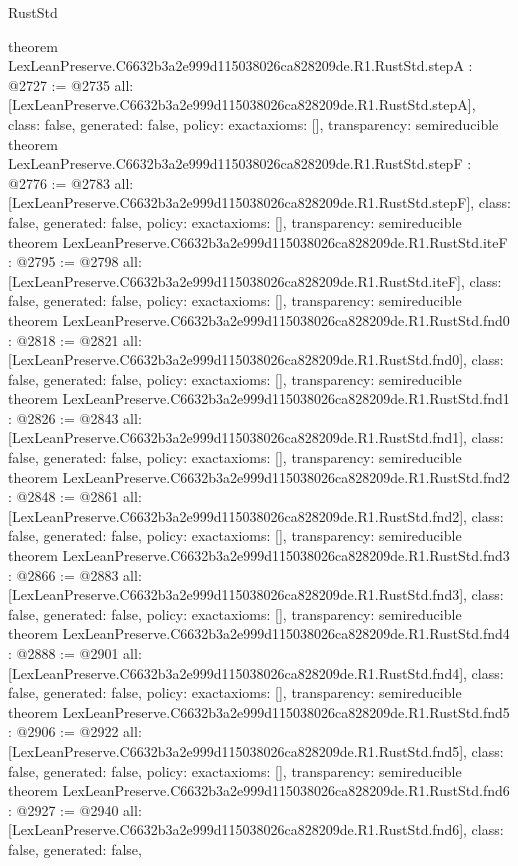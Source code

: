 \begin{lexlean}{RustStd}
\begin{coremodule}
{}
theorem LexLeanPreserve.C6632b3a2e999d115038026ca828209de.R1.RustStd.stepA : @2727 := @2735 {
  all: [LexLeanPreserve.C6632b3a2e999d115038026ca828209de.R1.RustStd.stepA],
  class: false,
  generated: false,
  policy: exact{axioms: []},
  transparency: semireducible
}
theorem LexLeanPreserve.C6632b3a2e999d115038026ca828209de.R1.RustStd.stepF : @2776 := @2783 {
  all: [LexLeanPreserve.C6632b3a2e999d115038026ca828209de.R1.RustStd.stepF],
  class: false,
  generated: false,
  policy: exact{axioms: []},
  transparency: semireducible
}
theorem LexLeanPreserve.C6632b3a2e999d115038026ca828209de.R1.RustStd.iteF : @2795 := @2798 {
  all: [LexLeanPreserve.C6632b3a2e999d115038026ca828209de.R1.RustStd.iteF],
  class: false,
  generated: false,
  policy: exact{axioms: []},
  transparency: semireducible
}
theorem LexLeanPreserve.C6632b3a2e999d115038026ca828209de.R1.RustStd.fnd0 : @2818 := @2821 {
  all: [LexLeanPreserve.C6632b3a2e999d115038026ca828209de.R1.RustStd.fnd0],
  class: false,
  generated: false,
  policy: exact{axioms: []},
  transparency: semireducible
}
theorem LexLeanPreserve.C6632b3a2e999d115038026ca828209de.R1.RustStd.fnd1 : @2826 := @2843 {
  all: [LexLeanPreserve.C6632b3a2e999d115038026ca828209de.R1.RustStd.fnd1],
  class: false,
  generated: false,
  policy: exact{axioms: []},
  transparency: semireducible
}
theorem LexLeanPreserve.C6632b3a2e999d115038026ca828209de.R1.RustStd.fnd2 : @2848 := @2861 {
  all: [LexLeanPreserve.C6632b3a2e999d115038026ca828209de.R1.RustStd.fnd2],
  class: false,
  generated: false,
  policy: exact{axioms: []},
  transparency: semireducible
}
theorem LexLeanPreserve.C6632b3a2e999d115038026ca828209de.R1.RustStd.fnd3 : @2866 := @2883 {
  all: [LexLeanPreserve.C6632b3a2e999d115038026ca828209de.R1.RustStd.fnd3],
  class: false,
  generated: false,
  policy: exact{axioms: []},
  transparency: semireducible
}
theorem LexLeanPreserve.C6632b3a2e999d115038026ca828209de.R1.RustStd.fnd4 : @2888 := @2901 {
  all: [LexLeanPreserve.C6632b3a2e999d115038026ca828209de.R1.RustStd.fnd4],
  class: false,
  generated: false,
  policy: exact{axioms: []},
  transparency: semireducible
}
theorem LexLeanPreserve.C6632b3a2e999d115038026ca828209de.R1.RustStd.fnd5 : @2906 := @2922 {
  all: [LexLeanPreserve.C6632b3a2e999d115038026ca828209de.R1.RustStd.fnd5],
  class: false,
  generated: false,
  policy: exact{axioms: []},
  transparency: semireducible
}
theorem LexLeanPreserve.C6632b3a2e999d115038026ca828209de.R1.RustStd.fnd6 : @2927 := @2940 {
  all: [LexLeanPreserve.C6632b3a2e999d115038026ca828209de.R1.RustStd.fnd6],
  class: false,
  generated: false,
}
\end{coremodule}
\end{lexlean}
